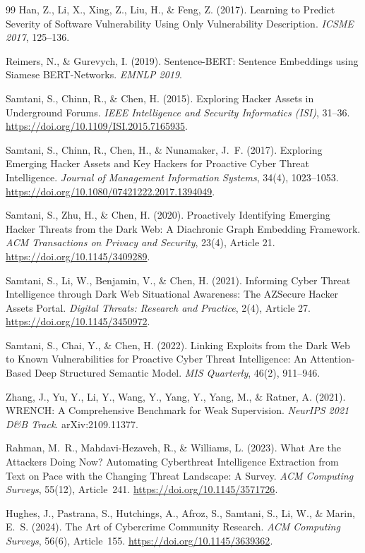 \documentclass{article}
\begin{document}
\begin{thebibliography}{99}
Han, Z., Li, X., Xing, Z., Liu, H., \& Feng, Z. (2017).
Learning to Predict Severity of Software Vulnerability Using Only
Vulnerability Description. \textit{ICSME 2017}, 125--136.

Reimers, N., \& Gurevych, I. (2019). Sentence-BERT:
Sentence Embeddings using Siamese BERT-Networks. \textit{EMNLP 2019}.

Samtani, S., Chinn, R., \& Chen, H. (2015).
Exploring Hacker Assets in Underground Forums.
\textit{IEEE Intelligence and Security Informatics (ISI)}, 31--36.
\url{https://doi.org/10.1109/ISI.2015.7165935}.

Samtani, S., Chinn, R., Chen, H., \& Nunamaker, J.\ F. (2017).
Exploring Emerging Hacker Assets and Key Hackers for Proactive Cyber
Threat Intelligence. \textit{Journal of Management Information Systems},
34(4), 1023--1053. \url{https://doi.org/10.1080/07421222.2017.1394049}.

Samtani, S., Zhu, H., \& Chen, H. (2020).
Proactively Identifying Emerging Hacker Threats from the Dark Web: A
Diachronic Graph Embedding Framework. \textit{ACM Transactions on Privacy
and Security}, 23(4), Article 21. \url{https://doi.org/10.1145/3409289}.

Samtani, S., Li, W., Benjamin, V., \& Chen, H. (2021).
Informing Cyber Threat Intelligence through Dark Web Situational
Awareness: The AZSecure Hacker Assets Portal. \textit{Digital Threats:
Research and Practice}, 2(4), Article 27.
\url{https://doi.org/10.1145/3450972}.

Samtani, S., Chai, Y., \& Chen, H. (2022).
Linking Exploits from the Dark Web to Known Vulnerabilities for Proactive
Cyber Threat Intelligence: An Attention-Based Deep Structured Semantic
Model. \textit{MIS Quarterly}, 46(2), 911--946.

Zhang, J., Yu, Y., Li, Y., Wang, Y., Yang, Y., Yang, M., \&
Ratner, A. (2021). WRENCH: A Comprehensive Benchmark for Weak
Supervision. \textit{NeurIPS 2021 D\&B Track}. arXiv:2109.11377.

Rahman, M.\ R., Mahdavi-Hezaveh, R., \& Williams, L. (2023).
What Are the Attackers Doing Now? Automating Cyberthreat Intelligence
Extraction from Text on Pace with the Changing Threat Landscape: A Survey.
\textit{ACM Computing Surveys}, 55(12), Article~241.
\url{https://doi.org/10.1145/3571726}.

Hughes, J., Pastrana, S., Hutchings, A., Afroz, S., Samtani, S.,
Li, W., \& Marin, E.\ S. (2024).
The Art of Cybercrime Community Research.
\textit{ACM Computing Surveys}, 56(6), Article~155.
\url{https://doi.org/10.1145/3639362}.

\end{thebibliography}
\end{document}

